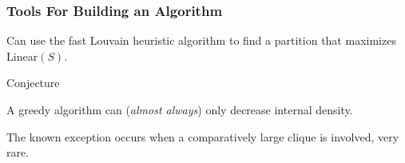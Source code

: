 \documentclass{beamer}
\begin{document}
\begin{frame}\frametitle{Tools For Building an Algorithm}

\begin{block}{}
\begin{center}
Can use the fast Louvain heuristic algorithm to find a partition that maximizes {\sc Linear}$(S)$.
\end{center}
\end{block}

\begin{block}{Conjecture}
\begin{center}
A greedy algorithm can ({\it almost always}) only decrease internal density.
\end{center}
\end{block}
The known exception occurs when a comparatively large clique is involved, very rare.
\end{frame}
\end{document}
